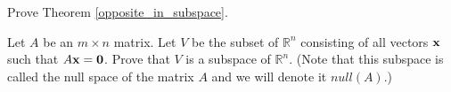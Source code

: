 \documentclass{ximera}
\renewcommand{\vec}[1]{{\bf #1}}
\newcommand{\RR}{\mathbb{R}}
\begin{document}
\begin{problem}\label{pr:opposite_in_subspace}
Prove Theorem \ref{opposite_in_subspace}.
\end{problem}

\begin{problem}\label{pr:null(A)_is_subspace}
Let $A$ be an $m \times n$ matrix.  Let $V$ be the subset of $\RR^n$ consisting of all vectors $\vec{x}$ such that $A \vec{x} = \vec{0}$.  Prove that $V$ is a subspace of $\RR^n$.  (Note that this subspace is called the null space of the matrix $A$ and we will denote it $null(A)$.)
\end{problem}
\end{document}

